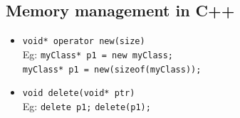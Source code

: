 \subsection{Memory management in C++}
\begin{itemize}
\item \texttt{void* operator new(size)}	\\
Eg: \texttt{myClass* p1 = new myClass;} \\
\texttt{myClass* p1 = new(sizeof(myClass));}\\
\item \texttt{void delete(void* ptr)}\\
Eg: \texttt{delete p1;} 
\texttt{delete(p1);} 
\end{itemize}
